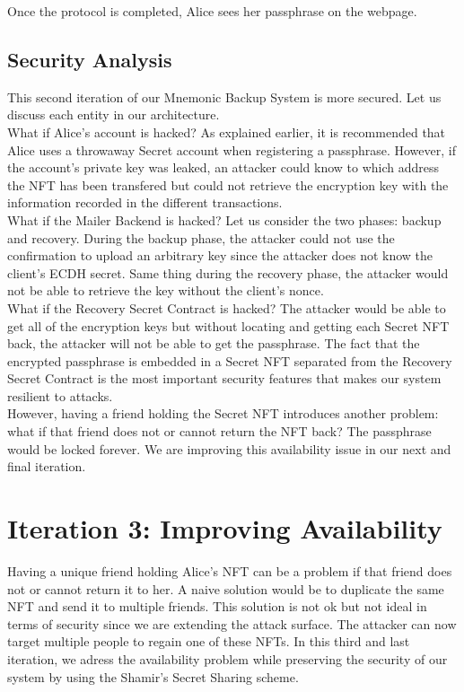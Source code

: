 \documentclass[12pt]{article}
\begin{document}
Once the protocol is completed, Alice sees her passphrase on the webpage.

\subsection{Security Analysis}

This second iteration of our Mnemonic Backup System is more secured. Let us discuss each entity in our architecture. \\

What if Alice's account is hacked? As explained earlier, it is recommended that Alice uses a throwaway Secret account when registering a passphrase. However, if the account's private key was leaked, an attacker could know to which address the NFT has been transfered but could not retrieve the encryption key with the information recorded in the different transactions. \\

What if the Mailer Backend is hacked? Let us consider the two phases: backup and recovery. During the backup phase, the attacker could not use the confirmation to upload an arbitrary key since the attacker does not know the client's ECDH secret. Same thing during the recovery phase, the attacker would not be able to retrieve the key without the client's nonce. \\

What if the Recovery Secret Contract is hacked? The attacker would be able to get all of the encryption keys but without locating and getting each Secret NFT back, the attacker will not be able to get the passphrase. The fact that the encrypted passphrase is embedded in a Secret NFT separated from the Recovery Secret Contract is the most important security features that makes our system resilient to attacks. \\

However, having a friend holding the Secret NFT introduces another problem: what if that friend does not or cannot return the NFT back? The passphrase would be locked forever. We are improving this availability issue in our next and final iteration. 

\section{Iteration 3: Improving Availability}
\label{iteration3}

Having a unique friend holding Alice's NFT can be a problem if that friend does not or cannot return it to her. A naive solution would be to duplicate the same NFT and send it to multiple friends. This solution is not ok but not ideal in terms of security since we are extending the attack surface. The attacker can now target multiple people to regain one of these NFTs. In this third and last iteration, we adress the availability problem while preserving the security of our system by using the Shamir's Secret Sharing scheme. 
\end{document}
